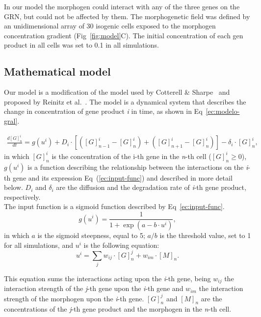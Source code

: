 \documentclass[10pt,letterpaper]{article}
\begin{document}
In our model the morphogen could interact with any of the three genes on the
GRN, but could not be affected by them. The morphogenetic field was defined by
an unidimensional array of 30 isogenic cells exposed to the morphogen
concentration gradient (Fig~\ref{fig:model}C). The initial concentration of
each gen product in all cells was set to 0.1 in all simulations.\\

\subsection*{Mathematical model}

Our model is a modification of the model used by Cotterell \& Sharpe~\cite{Cotterell2010}
and proposed by Reinitz et al.~\cite{Reinitz1995}. The
model is a dynamical system that describes the change in concentration of gene
product \emph{i} in time, as shown in Eq~\ref{ec:modelo-gral}.

 \begin{eqnarray}
  \frac{d[G]^i_n}{dt}
  = g(u^i) + D_i \cdot [ ([G]^i_{n-1}-[G]^i_n) +([G]^i_{n+1}-[G]^i_n)]-\delta_i
  \cdot [ G ]^i_n ,
  \label{ec:modelo-gral}
 \end{eqnarray}
\noindent
in which $[G]^{i}_{n}$ is the concentration of the i-th gene in the \emph{n}-th
cell ($[G]^{i}_{n} ≥ 0$), $g(u^i)$ is a function describing the relationship
between the interactions on the \emph{i}-th gene and its expression
Eq~(\ref{ec:input-func}) and described in more detail below. $D_i$ and
$\delta_i$ are the diffusion and the degradation rate of \emph{i}-th gene
product, respectively.\\

The input function is a sigmoid function described by Eq~\ref{ec:input-func}.
\begin{equation}
 g(u^i) = \frac{1}{1 + \exp(a - b \cdot u^i)},
 \label{ec:input-func}
\end{equation}
\noindent
in which $a$ is the sigmoid steepness, equal to 5; $a/b$ is the threshold value,
set to 1 for all simulations, and $u^i$ is the following equation:
\begin{equation}
 u^i = \sum_j w_{ij} \cdot [G]^j_n + w_{im} \cdot [M]_n.
 \label{ec:mat-sum}
\end{equation}

This equation sums the interactions acting upon the \emph{i}-th gene, being
$w_{ij}$ the interaction strength of the \emph{j}-th gene upon the \emph{i}-th
gene and $w_{im}$ the interaction strength of the morphogen upon the \emph{i}-th
gene. $[G]^j_n$ and $[M]_n$ are the concentrations of the \emph{j}-th gene
product and the morphogen in the \emph{n}-th cell.
\end{document}
